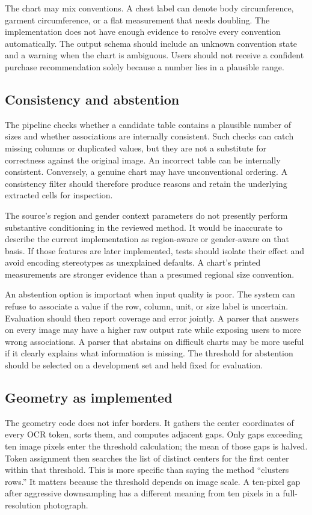 \documentclass[10pt,letterpaper]{article}
\begin{document}
The chart may mix conventions. A chest label can denote body circumference, garment circumference, or a flat measurement that needs doubling. The implementation does not have enough evidence to resolve every convention automatically. The output schema should include an unknown convention state and a warning when the chart is ambiguous. Users should not receive a confident purchase recommendation solely because a number lies in a plausible range.

\subsection{Consistency and abstention}

The pipeline checks whether a candidate table contains a plausible number of sizes and whether associations are internally consistent. Such checks can catch missing columns or duplicated values, but they are not a substitute for correctness against the original image. An incorrect table can be internally consistent. Conversely, a genuine chart may have unconventional ordering. A consistency filter should therefore produce reasons and retain the underlying extracted cells for inspection.

The source's region and gender context parameters do not presently perform substantive conditioning in the reviewed method. It would be inaccurate to describe the current implementation as region-aware or gender-aware on that basis. If those features are later implemented, tests should isolate their effect and avoid encoding stereotypes as unexplained defaults. A chart's printed measurements are stronger evidence than a presumed regional size convention.

An abstention option is important when input quality is poor. The system can refuse to associate a value if the row, column, unit, or size label is uncertain. Evaluation should then report coverage and error jointly. A parser that answers on every image may have a higher raw output rate while exposing users to more wrong associations. A parser that abstains on difficult charts may be more useful if it clearly explains what information is missing. The threshold for abstention should be selected on a development set and held fixed for evaluation.

\subsection{Geometry as implemented}

The geometry code does not infer borders. It gathers the center coordinates of every OCR token, sorts them, and computes adjacent gaps. Only gaps exceeding ten image pixels enter the threshold calculation; the mean of those gaps is halved. Token assignment then searches the list of distinct centers for the first center within that threshold. This is more specific than saying the method ``clusters rows.'' It matters because the threshold depends on image scale. A ten-pixel gap after aggressive downsampling has a different meaning from ten pixels in a full-resolution photograph.
\end{document}
